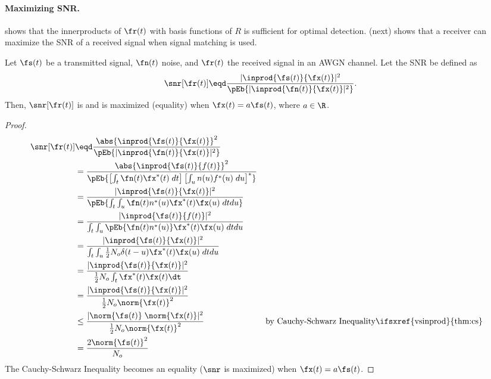 \paragraph{Maximizing SNR.}
 shows that the innerproducts of $\fr(t)$ with
basis functions of $R$ is sufficient for optimal detection.
 (next) shows that a receiver can
maximize the SNR of a received signal when signal matching is used.

\begin{theorem}
\label{thm:mf_maxSNR}
Let $\fs(t)$ be a transmitted signal, $\fn(t)$ noise, and $\fr(t)$ the received signal
in an AWGN channel.
Let the  SNR be defined as
   \[ \snr[\fr(t)] \eqd \frac{|\inprod{\fs(t)}{\fx(t)}|^2}
                            {\pEb{|\inprod{\fn(t)}{\fx(t)}|^2}}. \]
Then, $\snr[\fr(t)]$ is
and is maximized (equality) when $\fx(t)=a\fs(t)$, where $a\in\R$.
\end{theorem}

\begin{proof}
\begin{align*}
   \snr[\fr(t)]
     &\eqd \frac{\abs{\inprod{\fs(t)}{\fx(t)}}^2}
                {\pEb{|\inprod{\fn(t)}{\fx(t)}|^2}}
   \\&=    \frac{\abs{\inprod{\fs(t)}{f(t)}}^2}
                {\pEb{\left[\int_t \fn(t)\fx^\ast(t)\;dt\right]
                      \left[\int_u n(u)f^\ast(u)\;du\right]^\ast}
                }
   \\&=    \frac{|\inprod{\fs(t)}{\fx(t)}|^2}
                {\pEb{\int_t \int_u \fn(t)n^\ast(u)\fx^\ast(t)\fx(u)\;dtdu}}
   \\&=    \frac{|\inprod{\fs(t)}{f(t)}|^2}
                {\int_t \int_u \pEb{\fn(t)n^\ast(u)}\fx^\ast(t)\fx(u)\;dtdu}
   \\&=    \frac{|\inprod{\fs(t)}{\fx(t)}|^2}
                {\int_t \int_u \frac{1}{2}N_o\delta(t-u) \fx^\ast(t)\fx(u)\;dtdu}
   \\&=    \frac{|\inprod{\fs(t)}{\fx(t)}|^2}
                {\frac{1}{2}N_o \int_t \fx^\ast(t)\fx(t)\dt}
   \\&=    \frac{|\inprod{\fs(t)}{\fx(t)}|^2}
                {\frac{1}{2}N_o \norm{\fx(t)}^2}
   \\&\le  \frac{|\norm{\fs(t)}\;\norm{\fx(t)}|^2}
                {\frac{1}{2}N_o \norm{\fx(t)}^2}
     &&    \text{by Cauchy-Schwarz Inequality\ifsxref{vsinprod}{thm:cs}}
   \\&=    \frac{2\norm{\fs(t)}^2}
                {N_o }
\end{align*}
The Cauchy-Schwarz Inequality becomes an equality
($\snr$ is maximized) when $\fx(t)=a\fs(t)$.
\end{proof}

